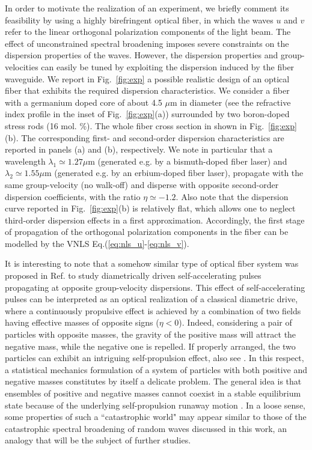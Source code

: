 \documentclass[pra,twocolumn,showpacs,preprintnumbers,amsmath,amssymb]{revtex4}
\begin{document}
In order to motivate the realization of an experiment, we briefly comment its feasibility by using a highly birefringent optical fiber, in which the waves $u$ and $v$ refer to the linear orthogonal polarization components of the light beam. 
The effect of unconstrained spectral broadening imposes severe constraints on the dispersion properties of the waves. 
However, the dispersion properties and group-velocities can easily be tuned by exploiting the dispersion induced by the fiber waveguide.
We report in Fig.~\ref{fig:exp} a possible realistic design of an optical fiber that exhibits the required dispersion characteristics.
We consider a fiber with a germanium doped core of about 4.5 $\mu$m in diameter (see the refractive index profile in the inset of Fig.~\ref{fig:exp}(a)) surrounded by two boron-doped stress rods (16 mol. \%). The whole fiber cross section in shown in Fig.~\ref{fig:exp}(b). The corresponding first- and second-order dispersion characteristics are reported in panels (a) and (b), respectively.
We note in particular that a wavelength $\lambda_1 \simeq 1.27 \mu$m (generated e.g. by a bismuth-doped fiber laser) and $\lambda_2 \simeq 1.55 \mu$m (generated e.g. by an erbium-doped fiber laser), propagate with the same group-velocity (no walk-off) and disperse with opposite second-order dispersion coefficients, with the ratio $\eta \simeq -1.2$.
Also note that the dispersion curve reported in Fig.~\ref{fig:exp}(b) is relatively flat, which allows one to neglect third-order dispersion effects in a first approximation.
Accordingly, the first stage of  propagation of the orthogonal polarization components in the fiber can be modelled by the VNLS Eq.(\ref{eq:nls_u}-\ref{eq:nls_v}).

It is interesting to note that a somehow similar type of optical fiber system was proposed in Ref.\cite{peschelPRL13} to study diametrically driven self-accelerating pulses propagating at opposite group-velocity dispersions. 
This effect of self-accelerating pulses can be interpreted as an optical realization of a classical diametric drive, where a continuously propulsive effect is achieved by a combination of two fields having effective masses of opposite signs ($\eta < 0$).
Indeed, considering a pair of particles with opposite masses, the gravity of the positive mass will attract the negative mass, while the negative one is repelled.
If properly arranged, the two particles can exhibit an intriguing self-propulsion effect, also see \cite{peschelNP13,longhi14,delrePRL16}. 
In this respect, a statistical mechanics formulation of a system of  particles with both positive and negative masses constitutes by itself a delicate problem.
The general idea is that ensembles of positive and negative masses cannot coexist in a stable equilibrium state because of the underlying self-propulsion runaway motion  \cite{pollard95}. 
In a loose sense, some properties of such a ``catastrophic world" may appear similar to those of the catastrophic spectral broadening of random waves discussed in this work, an analogy that will be the subject of further studies.
\end{document}
